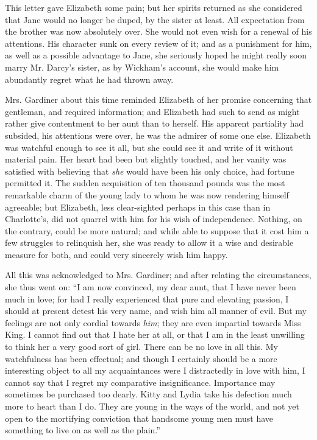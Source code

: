 This letter gave Elizabeth some pain; but her spirits returned as she considered that Jane would no longer be duped, by the sister at least. All expectation from the brother was now absolutely over. She would not even wish for a renewal of his attentions. His character sunk on every review of it; and as a punishment for him, as well as a possible advantage to Jane, she seriously hoped he might really soon marry Mr. Darcy's sister, as by Wickham's account, she would make him abundantly regret what he had thrown away.

Mrs. Gardiner about this time reminded Elizabeth of her promise concerning that gentleman, and required information; and Elizabeth had such to send as might rather give contentment to her aunt than to herself. His apparent partiality had subsided, his attentions were over, he was the admirer of some one else. Elizabeth was watchful enough to see it all, but she could see it and write of it without material pain. Her heart had been but slightly touched, and her vanity was satisfied with believing that {\em she} would have been his only choice, had fortune permitted it. The sudden acquisition of ten thousand pounds was the most remarkable charm of the young lady to whom he was now rendering himself agreeable; but Elizabeth, less clear-sighted perhaps in this case than in Charlotte's, did not quarrel with him for his wish of independence. Nothing, on the contrary, could be more natural; and while able to suppose that it cost him a few struggles to relinquish her, she was ready to allow it a wise and desirable measure for both, and could very sincerely wish him happy.

All this was acknowledged to Mrs. Gardiner; and after relating the circumstances, she thus went on: “I am now convinced, my dear aunt, that I have never been much in love; for had I really experienced that pure and elevating passion, I should at present detest his very name, and wish him all manner of evil. But my feelings are not only cordial towards {\em him}; they are even impartial towards Miss King. I cannot find out that I hate her at all, or that I am in the least unwilling to think her a very good sort of girl. There can be no love in all this. My watchfulness has been effectual; and though I certainly should be a more interesting object to all my acquaintances were I distractedly in love with him, I cannot say that I regret my comparative insignificance. Importance may sometimes be purchased too dearly. Kitty and Lydia take his defection much more to heart than I do. They are young in the ways of the world, and not yet open to the mortifying conviction that handsome young men must have something to live on as well as the plain.”

